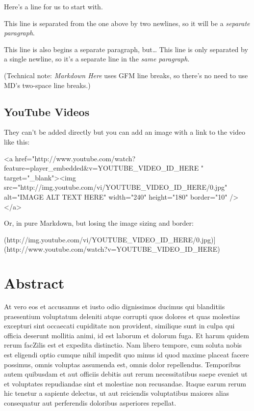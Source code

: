 \documentclass[
]{tufte-pandoc}
\newenvironment{Shaded}{}{}
\newcommand{\NormalTok}[1]{#1}
\begin{document}
Here's a line for us to start with.

This line is separated from the one above by two newlines, so it will be
a \emph{separate paragraph}.

This line is also begins a separate paragraph, but\ldots{} This line is
only separated by a single newline, so it's a separate line in the
\emph{same paragraph}.

(Technical note: \emph{Markdown Here} uses GFM line breaks, so there's
no need to use MD's two-space line breaks.)

\hypertarget{youtube-videos}{%
\subsection{YouTube Videos}\label{youtube-videos}}

They can't be added directly but you can add an image with a link to the
video like this:

\begin{Shaded}
\begin{Highlighting}[]
\NormalTok{\textless{}a href="http://www.youtube.com/watch?feature=player\_embedded\&v=YOUTUBE\_VIDEO\_ID\_HERE}
\NormalTok{" target="\_blank"\textgreater{}\textless{}img src="http://img.youtube.com/vi/YOUTUBE\_VIDEO\_ID\_HERE/0.jpg"}
\NormalTok{alt="IMAGE ALT TEXT HERE" width="240" height="180" border="10" /\textgreater{}\textless{}/a\textgreater{}}
\end{Highlighting}
\end{Shaded}

Or, in pure Markdown, but losing the image sizing and border:

\begin{Shaded}
\begin{Highlighting}[]
\NormalTok{[![IMAGE ALT TEXT HERE](http://img.youtube.com/vi/YOUTUBE\_VIDEO\_ID\_HERE/0.jpg)](http://www.youtube.com/watch?v=YOUTUBE\_VIDEO\_ID\_HERE)}
\end{Highlighting}
\end{Shaded}

\hypertarget{abstract}{%
\section*{Abstract}\label{abstract}}

At vero eos et accusamus et iusto odio dignissimos ducimus qui
blanditiis praesentium voluptatum deleniti atque corrupti quos dolores
et quas molestias excepturi sint occaecati cupiditate non provident,
similique sunt in culpa qui officia deserunt mollitia animi, id est
laborum et dolorum fuga. Et harum quidem rerum facZilis est et expedita
distinctio. Nam libero tempore, cum soluta nobis est eligendi optio
cumque nihil impedit quo minus id quod maxime placeat facere possimus,
omnis voluptas assumenda est, omnis dolor repellendus. Temporibus autem
quibusdam et aut officiis debitis aut rerum necessitatibus saepe eveniet
ut et voluptates repudiandae sint et molestiae non recusandae. Itaque
earum rerum hic tenetur a sapiente delectus, ut aut reiciendis
voluptatibus maiores alias consequatur aut perferendis doloribus
asperiores repellat.
\end{document}
